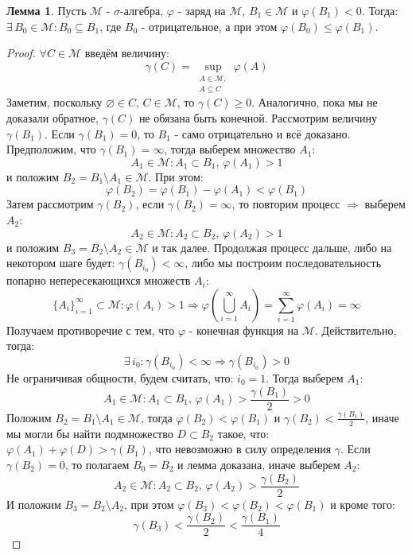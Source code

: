 \documentclass[12pt]{article}
\newcommand{\MM}{\mathcal{M}}
\newcommand{\VN}{\varnothing}
\theoremstyle{definition}
\newtheorem{lemma}{Лемма}
\newcommand{\ddsum}[2]{\displaystyle\sum\limits_{#1}^{#2}}
\begin{document}
\begin{lemma}
	Пусть $\MM$ - $\sigma$-алгебра, $\varphi$ - заряд на $\MM$, $B_1 \in \MM$ и $\varphi(B_1) < 0$. Тогда: $\exists \, B_0 \in \MM \colon B_0 \subseteq B_1$, где $B_0$ - отрицательное, а при этом $\varphi(B_0) \leq \varphi(B_1)$.
\end{lemma}
\begin{proof}
	$\forall C \in \MM$ введём величину: 
	$$
		\gamma(C) = \sup\limits_{\substack{A \in \MM, \\ A \subseteq C}} \varphi(A)
	$$
	Заметим, поскольку $\VN \in C, \, C \in \MM$, то $\gamma(C) \geq 0$. Аналогично, пока мы не доказали обратное, $\gamma(C)$ не обязана быть конечной. Рассмотрим величину $\gamma(B_1)$. Если $\gamma(B_1) = 0$, то $B_1$ - само отрицательно и всё доказано. Предположим, что $\gamma(B_1) = \infty$, тогда выберем множество $A_1$: 
	$$
		A_1 \in \MM \colon A_1 \subset B_1, \, \varphi(A_1) > 1 
	$$
	и положим $B_2 = B_1 \setminus A_1 \in \MM$. При этом: 
	$$
		\varphi(B_2) = \varphi(B_1) - \varphi(A_1) < \varphi(B_1)
	$$
	Затем рассмотрим $\gamma(B_2)$, если $\gamma(B_2) = \infty$, то повторим процесс $\Rightarrow$ выберем $A_2$:
	$$
		A_2 \in \MM \colon A_2 \subset B_2, \, \varphi(A_2) > 1
	$$
	и положим $B_3 = B_2 \setminus A_2 \in \MM$ и так далее. Продолжая процесс дальше, либо на некотором шаге будет: $\gamma(B_{i_0}) < \infty$, либо мы построим последовательность попарно непересекающихся множеств $A_i$:
	$$
		\{A_i\}_{i = 1}^{\infty} \subset \MM \colon \varphi(A_i) > 1 \Rightarrow \varphi\left(\bigcup\limits_{i = 1}^{\infty}A_i\right) = \ddsum{i = 1}{\infty}\varphi(A_i) = \infty
	$$
	Получаем противоречие с тем, что $\varphi$ - конечная функция на $\MM$. Действительно, тогда:
	$$
		\exists \, i_0 \colon \gamma(B_{i_0}) < \infty \Rightarrow \gamma(B_{i_0}) > 0
	$$
	Не ограничивая общности, будем считать, что: $i_0 = 1$. Тогда выберем $A_1$:
	$$
		A_1 \in \MM \colon A_1 \subset B_1, \, \varphi(A_1) > \dfrac{\gamma(B_1)}{2} > 0
	$$
	Положим $B_2 = B_1 \setminus A_1 \in \MM$, тогда $\varphi(B_2) < \varphi(B_1)$ и $\gamma(B_2) < \tfrac{\gamma(B_1)}{2}$, иначе мы могли бы найти подмножество $D \subset B_2$ такое, что: $\varphi(A_1) + \varphi(D) > \gamma(B_1)$, что невозможно в силу определения $\gamma$. Если $\gamma(B_2) = 0$, то полагаем $B_0 = B_2$ и лемма доказана, иначе выберем $A_2$:
	$$
		A_2 \in \MM \colon A_2 \subset B_2, \, \varphi(A_2) > \dfrac{\gamma(B_2)}{2} 
	$$
	И положим $B_3 = B_2 \setminus A_2$, при этом $\varphi(B_3) < \varphi(B_2) < \varphi(B_1)$ и кроме того:
	$$
		\gamma(B_3) < \dfrac{\gamma(B_2)}{2} < \dfrac{\gamma(B_1)}{4}
$$
\end{proof}
\end{document}
